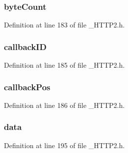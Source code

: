 \subsubsection[{byte\+Count}]{ byte\+Count}\label{struct_h_t_t_p___c_o_n_n_aa02a3d23a030e9524e25decbb213db08}


Definition at line 183 of file \+\_\+\+H\+T\+T\+P2.\+h.

\hypertarget{struct_h_t_t_p___c_o_n_n_a5bd816e738bd3e57c98db6c81a47750a}{}
\subsubsection[{callback\+I\+D}]{ callback\+I\+D}\label{struct_h_t_t_p___c_o_n_n_a5bd816e738bd3e57c98db6c81a47750a}


Definition at line 185 of file \+\_\+\+H\+T\+T\+P2.\+h.

\hypertarget{struct_h_t_t_p___c_o_n_n_a9c5c499daa5e0edb7523c8a0ff7fb3a5}{}
\subsubsection[{callback\+Pos}]{ callback\+Pos}\label{struct_h_t_t_p___c_o_n_n_a9c5c499daa5e0edb7523c8a0ff7fb3a5}


Definition at line 186 of file \+\_\+\+H\+T\+T\+P2.\+h.

\hypertarget{struct_h_t_t_p___c_o_n_n_aa8e32b014e1b7e123bb31a518ae46a30}{}
\subsubsection[{data}]{ data}\label{struct_h_t_t_p___c_o_n_n_aa8e32b014e1b7e123bb31a518ae46a30}


Definition at line 195 of file \+\_\+\+H\+T\+T\+P2.\+h.

